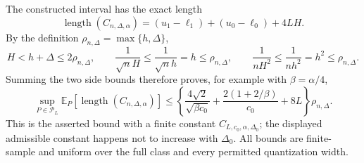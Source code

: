 The constructed interval has the exact length
\[
 \operatorname{length}(C_{n,\Delta,\alpha})
 =(u_1-\ell_1)+(u_0-\ell_0)+4LH.
\]
By the definition \(\rho_{n,\Delta}=\max\{h,\Delta\}\),
\[
 H<h+\Delta\leq2\rho_{n,\Delta},
 \qquad
 \frac1{\sqrt n H}\leq\frac1{\sqrt n h}=h\leq\rho_{n,\Delta},
 \qquad
 \frac1{nH^2}\leq\frac1{nh^2}=h^2\leq\rho_{n,\Delta}.
\]
Summing the two side bounds therefore proves, for example with \(\beta=\alpha/4\),
\[
 \sup_{P\in\mathcal P_L}\mathbb E_P[\operatorname{length}(C_{n,\Delta,\alpha})]
 \leq
 \left\{
 \frac{4\sqrt2}{\sqrt{\beta c_0}}
 +\frac{2(1+2/\beta)}{c_0}+8L
 \right\}\rho_{n,\Delta}.
\]
This is the asserted bound with a finite constant \(C_{L,c_0,\alpha,\Delta_0}\); the displayed admissible constant happens not to increase with \(\Delta_0\).  All bounds are finite-sample and uniform over the full class and every permitted quantization width.